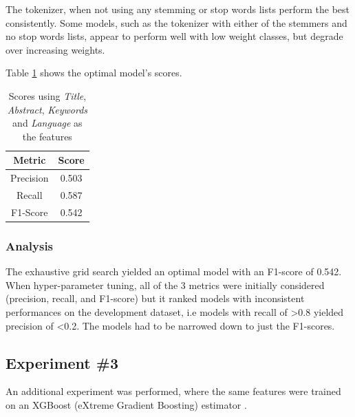 \documentclass[11pt]{article}
\begin{document}
The tokenizer, when not using any stemming or stop words lists perform the best consistently. Some models, such as the tokenizer with either of the stemmers and no stop words lists, appear to perform well with low weight classes, but degrade over increasing weights.

Table \ref{table:gs1_score} shows the optimal model's scores.
\begin{table}[!ht]
    \caption{Scores using \textit{Title}, \textit{Abstract}, \textit{Keywords} and \textit{Language} as the features}
    \label{table:gs1_score}
    \begin{center}

        \begin{tabular}{| c | c |}
        \hline
        \textbf{Metric} & \textbf{Score}
        \\ \hline
        Precision & 0.503 
        \\ \hline
        Recall & 0.587
        \\ \hline
        F1-Score & 0.542
        \\ \hline
        \end{tabular}

    \end{center}

\end{table}

\subsubsection{Analysis}
The exhaustive grid search yielded an optimal model with an F1-score of 0.542. When hyper-parameter tuning, all of the 3 metrics were initially considered (precision, recall, and F1-score) but it ranked models with inconsistent performances on the development dataset, i.e models with recall of >0.8 yielded precision of <0.2. The models had to be narrowed down to just the F1-scores.

\subsection{Experiment \#3}
An additional experiment was performed, where the same features were trained on an XGBoost (eXtreme Gradient Boosting) estimator \cite{Chen_2016}. 
\end{document}

